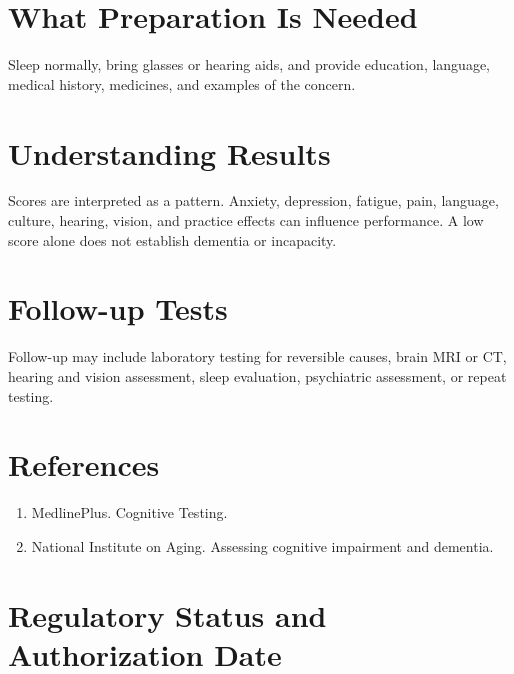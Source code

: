 \section*{What Preparation Is Needed}
Sleep normally, bring glasses or hearing aids, and provide education, language, medical history, medicines, and examples of the concern.
\section*{Understanding Results}
Scores are interpreted as a pattern. Anxiety, depression, fatigue, pain, language, culture, hearing, vision, and practice effects can influence performance. A low score alone does not establish dementia or incapacity.
\section*{Follow-up Tests}
Follow-up may include laboratory testing for reversible causes, brain MRI or CT, hearing and vision assessment, sleep evaluation, psychiatric assessment, or repeat testing.
\section*{References}
\begin{enumerate}\item MedlinePlus. Cognitive Testing.\item National Institute on Aging. Assessing cognitive impairment and dementia.\end{enumerate}
\clearpage
\section*{Regulatory Status and Authorization Date}\clearpage
